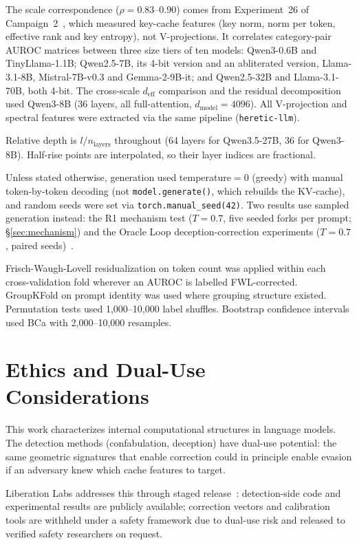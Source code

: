 \documentclass[11pt,a4paper]{article}
\begin{document}
The scale correspondence ($\rho = 0.83$--$0.90$) comes from Experiment~26 of
Campaign~2~\citep{lyra2026campaign2}, which measured key-cache features
(key norm, norm per token, effective rank and key entropy), not
V-projections. It correlates category-pair AUROC matrices between three
size tiers of ten models: Qwen3-0.6B and TinyLlama-1.1B; Qwen2.5-7B, its
4-bit version and an abliterated version, Llama-3.1-8B, Mistral-7B-v0.3
and Gemma-2-9B-it; and Qwen2.5-32B and Llama-3.1-70B, both 4-bit. The
cross-scale $d_\text{eff}$ comparison
and the residual decomposition used Qwen3-8B (36 layers, all full-attention,
$d_\text{model}{=}4096$). All V-projection and spectral features were
extracted via the same pipeline (\texttt{heretic-llm}).

Relative depth is $l/n_\text{layers}$ throughout (64 layers for
Qwen3.5-27B, 36 for Qwen3-8B). Half-rise points are interpolated, so
their layer indices are fractional.

Unless stated otherwise, generation used temperature${=}0$ (greedy) with
manual token-by-token decoding (not \texttt{model.generate()}, which
rebuilds the KV-cache), and random seeds were set via
\texttt{torch.manual\_seed(42)}. Two results use sampled generation
instead: the R1 mechanism test ($T{=}0.7$, five seeded forks per prompt;
\S\ref{sec:mechanism}) and the Oracle Loop deception-correction
experiments ($T{=}0.7$, paired seeds)~\citep{cc2026targeted}.

Frisch-Waugh-Lovell residualization on token count was applied within each
cross-validation fold wherever an AUROC is labelled FWL-corrected. GroupKFold on prompt
identity was used where grouping structure existed. Permutation tests used
1{,}000--10{,}000 label shuffles. Bootstrap confidence intervals used BCa
with 2{,}000--10{,}000 resamples.

\section*{Ethics and Dual-Use Considerations}

This work characterizes internal computational structures in language models.
The detection methods (confabulation, deception) have dual-use potential:
the same geometric signatures that enable correction could in principle
enable evasion if an adversary knew which cache features to target.

Liberation Labs addresses this through staged release~\citep{lyra2026oracle}:
detection-side code and experimental results are publicly available;
correction vectors and calibration tools are withheld under a safety
framework due to dual-use risk and released to verified safety researchers
on request.
\end{document}
